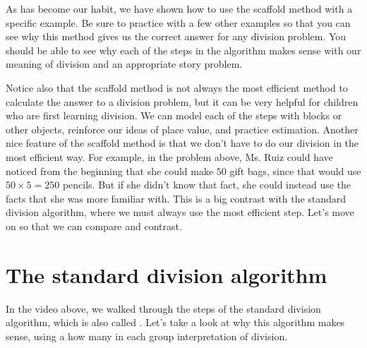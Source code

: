\documentclass{ximera}
\begin{document}
As has become our habit, we have shown how to use the scaffold method with a specific example. Be sure to practice with a few other examples so that you can see why this method gives us the correct answer for any division problem. You should be able to see why each of the steps in the algorithm makes sense with our meaning of division and an appropriate story problem.

Notice also that the scaffold method is not always the most efficient method to calculate the answer to a division problem, but it can be very helpful for children who are first learning division. We can model each of the steps with blocks or other objects, reinforce our ideas of place value, and practice estimation. Another nice feature of the scaffold method is that we don't have to do our division in the most efficient way. For example, in the problem above, Ms. Ruiz could have noticed from the beginning that she could make $50$ gift bags, since that would use $50 \times 5 = 250$ pencils. But if she didn't know that fact, she could instead use the facts that she was more familiar with. This is a big contrast with the standard division algorithm, where we must always use the most efficient step. Let's move on so that we can compare and contrast.





\section{The standard division algorithm}

In the video above, we walked through the steps of the standard division algorithm, which is also called . Let's take a look at why this algorithm makes sense, using a how many in each group interpretation of division.
\end{document}
